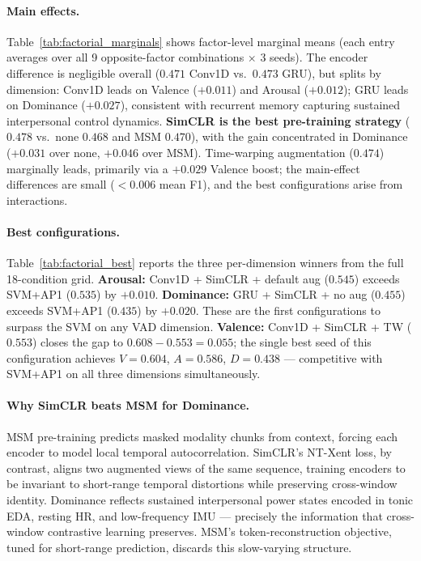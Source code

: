 \documentclass[sigconf,nonacm]{acmart}
\begin{document}
\paragraph{Main effects.}
Table~\ref{tab:factorial_marginals} shows factor-level marginal means
(each entry averages over all 9 opposite-factor combinations $\times$ 3 seeds).
The encoder difference is negligible overall ($0.471$ Conv1D vs.\ $0.473$
GRU), but splits by dimension: Conv1D leads on Valence ($+0.011$) and Arousal
($+0.012$); GRU leads on Dominance ($+0.027$), consistent with recurrent
memory capturing sustained interpersonal control dynamics.
\textbf{SimCLR is the best pre-training strategy} ($0.478$ vs.\ none $0.468$
and MSM $0.470$), with the gain concentrated in Dominance
($+0.031$ over none, $+0.046$ over MSM).
Time-warping augmentation ($0.474$) marginally leads, primarily via a
$+0.029$ Valence boost; the main-effect differences are small
($<0.006$ mean F1), and the best configurations arise from interactions.

\paragraph{Best configurations.}
Table~\ref{tab:factorial_best} reports the three per-dimension winners from
the full 18-condition grid.
\textbf{Arousal:} Conv1D + SimCLR + default aug ($0.545$) exceeds SVM+AP1
($0.535$) by $+0.010$.
\textbf{Dominance:} GRU + SimCLR + no aug ($0.455$) exceeds SVM+AP1
($0.435$) by $+0.020$.
These are the first configurations to surpass the SVM on any VAD dimension.
\textbf{Valence:} Conv1D + SimCLR + TW ($0.553$) closes the gap to
$0.608 - 0.553 = 0.055$; the single best seed of this configuration
achieves $V{=}0.604$, $A{=}0.586$, $D{=}0.438$ --- competitive with
SVM+AP1 on all three dimensions simultaneously.

\paragraph{Why SimCLR beats MSM for Dominance.}
MSM pre-training predicts masked modality chunks from context, forcing each
encoder to model local temporal autocorrelation.
SimCLR's NT-Xent loss, by contrast, aligns two augmented views of the same
sequence, training encoders to be invariant to short-range temporal
distortions while preserving cross-window identity.
Dominance reflects sustained interpersonal power states encoded in tonic EDA,
resting HR, and low-frequency IMU --- precisely the information that
cross-window contrastive learning preserves.
MSM's token-reconstruction objective, tuned for short-range prediction,
discards this slow-varying structure.
\end{document}

